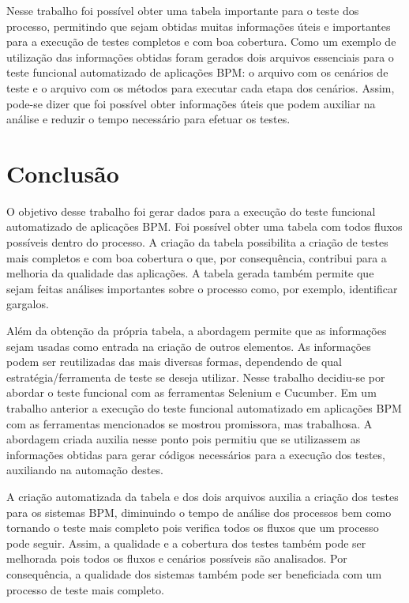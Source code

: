 \documentclass[12pt]{article}
\begin{document}
Nesse trabalho foi possível obter uma tabela importante para o teste dos processo, permitindo que sejam obtidas muitas informações úteis e importantes para a execução de testes completos e com boa cobertura. Como um exemplo de utilização das informações obtidas foram gerados dois arquivos essenciais para o teste funcional automatizado de aplicações BPM: o arquivo com os cenários de teste e o arquivo com os métodos para executar cada etapa dos cenários. Assim, pode-se dizer que foi possível obter informações úteis que podem auxiliar na análise e reduzir o tempo necessário para efetuar os testes.

\section{Conclusão}
O objetivo desse trabalho foi gerar dados para a execução do teste funcional automatizado de aplicações BPM. Foi possível obter uma tabela com todos fluxos possíveis dentro do processo. A criação da tabela possibilita a criação de testes mais completos e com boa cobertura o que, por consequência, contribui para a melhoria da qualidade das aplicações. A tabela gerada também permite que sejam feitas análises importantes sobre o processo como, por exemplo, identificar gargalos.

Além da obtenção da própria tabela, a abordagem permite que as informações sejam usadas como entrada na criação de outros elementos. As informações podem ser reutilizadas das mais diversas formas, dependendo de qual estratégia/ferramenta de teste se deseja utilizar. Nesse trabalho decidiu-se por abordar o teste funcional com as ferramentas Selenium e Cucumber. Em um trabalho anterior a execução do teste funcional automatizado em aplicações BPM com as ferramentas mencionados se mostrou promissora, mas trabalhosa. A abordagem criada auxilia nesse ponto pois permitiu que se utilizassem as informações obtidas para gerar códigos necessários para a execução dos testes, auxiliando na automação destes.

A criação automatizada da tabela e dos dois arquivos auxilia a criação dos testes para os sistemas BPM, diminuindo o tempo de análise dos processos bem como tornando o teste mais completo pois verifica todos os fluxos que um processo pode seguir. Assim, a qualidade e a cobertura dos testes também pode ser melhorada pois todos os fluxos e cenários possíveis são analisados. Por consequência, a qualidade dos sistemas também pode ser beneficiada com um processo de teste mais completo.
\end{document}
